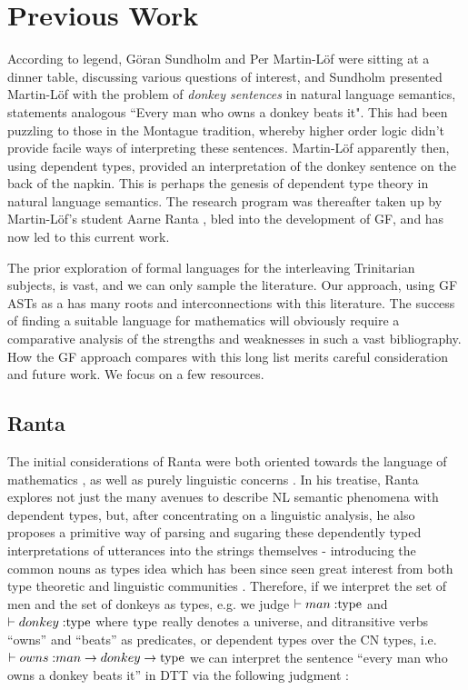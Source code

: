 \section{Previous Work}

According to legend, Göran Sundholm and Per Martin-Löf were sitting at a dinner
table, discussing various questions of interest, and Sundholm presented
Martin-Löf with the problem of \emph{donkey sentences} in natural language
semantics, statements analogous ``Every man who owns a donkey beats it". This
had been puzzling to those in the Montague tradition, whereby higher order logic
didn't provide facile ways of interpreting these sentences. Martin-Löf
apparently then, using dependent types, provided an interpretation of the donkey
sentence on the back of the napkin. This is perhaps the genesis of dependent
type theory in natural language semantics. The research program was thereafter
taken up by Martin-Löf's student Aarne Ranta \cite{ranta1994type}, bled into the
development of GF, and has now led to this current work.

The prior exploration of formal languages for the interleaving Trinitarian
subjects, is vast, and we can only sample the literature\cite{surveyLang}. Our
approach, using GF ASTs as a has many roots and interconnections with this
literature. The success of finding a suitable language for mathematics will
obviously require a comparative analysis of the strengths and weaknesses in such
a vast bibliography. How the GF approach compares with this long list merits
careful consideration and future work. We focus on a few resources.

\subsection{Ranta}

The initial considerations of Ranta were both oriented towards the language of
mathematics \cite{ranta93}, as well as purely linguistic concerns
\cite{ranta1994type}. In his treatise, Ranta explores not just the many avenues
to describe NL semantic phenomena with dependent types, but, after concentrating
on a linguistic analysis, he also proposes a primitive way of parsing and
sugaring these dependently typed interpretations of utterances into the strings
themselves - introducing the common nouns as types idea which has been since
seen great interest from both type theoretic and linguistic communities
\cite{luoCNs}. Therefore, if we interpret the set of men and the set of donkeys
as types, e.g. we judge $\vdash man \; {:} {\rm type}$ and $\vdash donkey \; {:}
{\rm type}$ where ${\rm type}$ really denotes a universe, and ditransitive verbs
``owns'' and ``beats'' as predicates, or dependent types over the CN types, i.e.
$\vdash owns \; {:} man \rightarrow donkey \rightarrow {\rm type}$ we can
interpret the sentence ``every man who owns a donkey beats it'' in DTT via the
following judgment :

